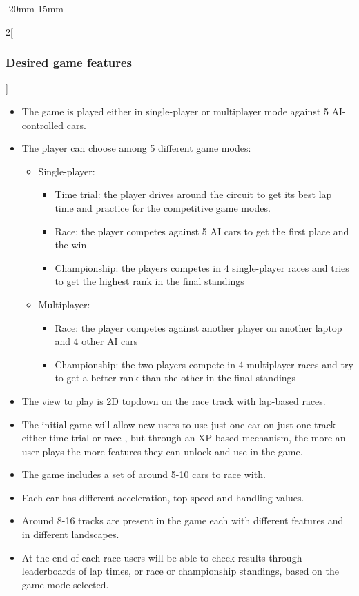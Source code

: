 \documentclass[12pt]{article}
\begin{document}
\begin{adjustwidth}{-20mm}{-15mm}
\begin{multicols}{2}[\subsubsection{Desired game features}]
\raggedcolumns
\begin{itemize}
\item The game is played either in single-player or multiplayer mode against 5 AI-controlled cars.
\item The player can choose among 5 different game modes:
\begin{itemize}
\item Single-player:
\begin{itemize}
\item Time trial: the player drives around the circuit to get its best lap time and practice for the competitive game modes.
\item Race: the player competes against 5 AI cars to get the first place and the win
\item Championship: the players competes in 4 single-player races and tries to get the highest rank in the final standings
\end{itemize}
\item Multiplayer:
\begin{itemize}
\item Race: the player competes against another player on another laptop and 4 other AI cars
\item Championship: the two players compete in 4 multiplayer races and try to get a better rank than the other in the final standings
\end{itemize}
\end{itemize}
\item The view to play is 2D topdown on the race track with lap-based races.
\item The initial game will allow new users to use just one car on just one track - either time trial or race-, but through an XP-based mechanism, the more an user plays the more features they can unlock and use in the game.
\item The game includes a set of around 5-10 cars to race with.
\item Each car has different acceleration, top speed and handling values.
\item Around 8-16 tracks are present in the game each with different features and in different landscapes.
\item At the end of each race users will be able to check results through leaderboards of lap times, or race or championship standings, based on the game mode selected.

\end{itemize}
\end{multicols}
\end{adjustwidth}
\end{document}
